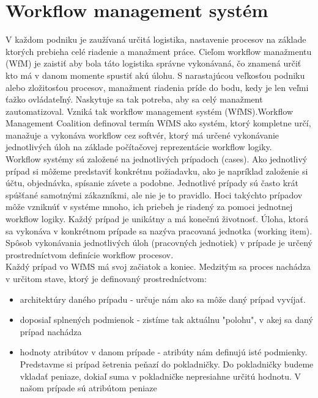 
\section{Workflow management systém}
V každom podniku je zaužívaná určitá logistika, nastavenie procesov na základe ktorých prebieha celé riadenie a manažment práce. Cieľom workflow manažmentu (WfM) je zaistiť aby bola táto logistika správne vykonávaná, čo znamená určiť kto má v danom momente spustiť akú úlohu. S narastajúcou veľkosťou podniku alebo zložitosťou procesov, manažment riadenia príde do bodu, kedy je len veľmi ťažko ovládateľný. Naskytuje sa tak potreba, aby sa celý manažment zautomatizoval. Vzniká tak workflow management systém (WfMS).Workflow Management Coalition definoval termín WfMS ako systém, ktorý kompletne určí, manažuje a vykonáva workflow cez softvér, ktorý má určené vykonávanie jednotlivých úloh na základe počítačovej reprezentácie workflow logiky. \cite{aalst}\\



Workflow systémy sú založené na jednotlivých prípadoch (cases). Ako jednotlivý prípad si môžeme predstaviť konkrétnu požiadavku, ako je napríklad založenie si účtu, objednávka, spísanie závete a podobne. Jednotlivé prípady sú často krát spúšťané samotnými zákazníkmi, ale nie je to pravidlo. Hoci takýchto prípadov môže vzniknúť v systéme mnoho, ich priebeh je riadený za pomoci jednotnej workflow logiky. Každý prípad je unikátny a má konečnú životnosť.  Úloha, ktorá sa vykonáva v konkrétnom prípade sa nazýva pracovaná jednotka (working item).
Spôsob vykonávania jednotlivých úloh (pracovných jednotiek) v prípade  je určený prostredníctvom definície workflow procesov. \cite{aalst}  \\	 



Každý prípad vo WfMS má svoj začiatok a koniec. Medzitým sa proces nachádza v určitom stave, ktorý je definovaný prostredníctvom:
\begin{itemize}
	\item architektúry daného prípadu - určuje nám ako sa môže daný prípad vyvíjať. 
	\item doposiaľ splnených podmienok - zistíme tak aktuálnu "polohu", v akej sa daný prípad nachádza 
	\item hodnoty atribútov v danom prípade - atribúty nám definujú isté podmienky. Predstavme si prípad šetrenia peňazí do pokladničky. Do pokladničky budeme vkladať peniaze, dokiaľ suma v pokladničke nepresiahne určitú hodnotu. V našom prípade sú atribútom peniaze
\end{itemize}

